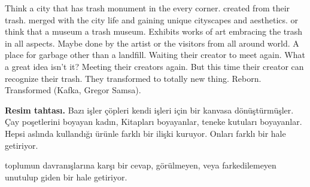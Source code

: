 Think a city that has trash monument in the every corner. created from their trash. merged with the city life and gaining unique cityscapes and aesthetics. or think that a museum a trash museum. Exhibits works of art embracing the trash in all aspects. Maybe done by the artist or the visitors from all around world. A place for garbage other than a landfill. Waiting their creator to meet again. What a great idea isn't it? Meeting their creators again. But this time their creator can recognize their trash. They transformed to totally new thing. Reborn. Transformed (Kafka, Gregor Samsa).



\textbf{Resim tahtası.} Bazı işler çöpleri kendi işleri için bir kanvasa dönüştürmüşler. Çay poşetlerini boyayan kadın, Kitapları boyayanlar, teneke kutuları boyayanlar. Hepsi aslında kullandığı ürünle farklı bir ilişki kuruyor. Onları farklı bir hale getiriyor.  

toplumun davranışlarına karşı bir cevap, görülmeyen, veya farkedilemeyen unutulup giden bir hale getiriyor.

